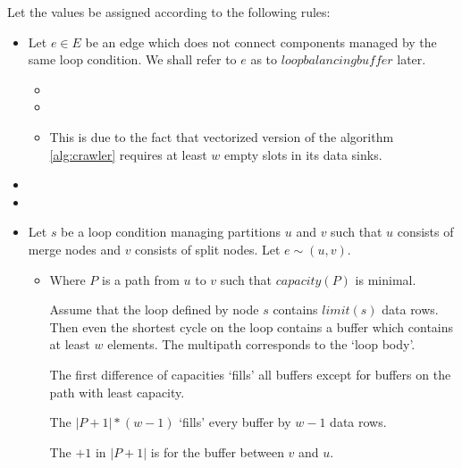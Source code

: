   Let the values be assigned according to the following rules:
  \begin{itemize}
    \item Let $e \in E$ be an edge which does not connect components managed by the same loop condition. We shall refer to $e$ as to $loop balancing buffer$ later.
    \begin{itemize}
      \item {}
      \item {}
      \item {}
        
        \textnormal{This is due to the fact that vectorized version of the algorithm \ref{alg:crawler} requires at least $w$ empty slots in its data sinks.}

    \end{itemize}
    \item {}
    \item {} 
    \item Let $s$ be a loop condition managing partitions $u$ and $v$ such that $u$ consists of merge nodes and $v$ consists of split nodes. Let $e \sim (u,v)$.
    \begin{itemize}
      \item {} 

      Where $P$ is a path from $u$ to $v$ such that $capacity(P)$ is minimal.

        \textnormal{ Assume that the loop defined by node $s$ contains $limit(s)$ data rows. Then even the shortest cycle on the loop contains a buffer which contains at least $w$ elements. The multipath corresponds to the `loop body'. }
        
        \textnormal{The first difference of capacities `fills' all buffers except for buffers on the path with least capacity. }
        
        \textnormal{The $| P +1 | * (w-1)$ `fills' every buffer by $w-1$ data rows. }
        
        \textnormal{The $+1$ in $|P + 1|$ is for the buffer between $v$ and $u$. }
        

\end{itemize}
\end{itemize}
